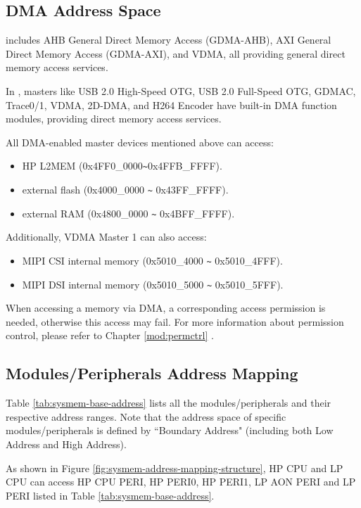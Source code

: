 \documentclass[main\_\_EN.tex]{subfiles}
\begin{document}
\subsection{DMA Address Space}
\chipname{} includes AHB General Direct Memory Access (GDMA-AHB), AXI General Direct Memory Access (GDMA-AXI), and VDMA, all providing general direct memory access services.

In \chipname{}, masters like USB 2.0 High-Speed OTG, USB 2.0 Full-Speed OTG, GDMAC, Trace0/1, VDMA, 2D-DMA, and H264 Encoder have built-in DMA function modules, providing direct memory access services.

All DMA-enabled master devices mentioned above can access:
\begin{itemize}
    \item HP L2MEM (0x4FF0\_0000\verb+~+0x4FFB\_FFFF).
    \item external flash (0x4000\_0000 \verb+~+ 0x43FF\_FFFF).
    \item external RAM (0x4800\_0000 \verb+~+ 0x4BFF\_FFFF).
\end{itemize}
Additionally, VDMA Master 1 can also access:
\begin{itemize}
    \item MIPI CSI internal memory (0x5010\_4000 \verb+~+ 0x5010\_4FFF).
    \item MIPI DSI internal memory (0x5010\_5000 \verb+~+ 0x5010\_5FFF).
\end{itemize}

\begin{tiplisting}
When accessing a memory via DMA, a corresponding access permission is needed, otherwise this access may fail. For more information about permission control, please refer to Chapter  \ref{mod:permctrl} \textit{}.
\end{tiplisting}

\subsection{Modules/Peripherals Address Mapping}
\label{para:sysmem-mod-peri-add-mapping}

Table \ref{tab:sysmem-base-address} lists all the modules/peripherals and their respective address ranges.
Note that the address space of specific modules/peripherals is defined by ``Boundary Address" (including both Low Address and High Address).



\begin{tiplisting}
As shown in Figure \ref{fig:sysmem-address-mapping-structure}, HP CPU and LP CPU can access HP CPU PERI, HP PERI0, HP PERI1, LP AON PERI and LP PERI listed in Table \ref{tab:sysmem-base-address}.
\end{tiplisting}
\end{document}
